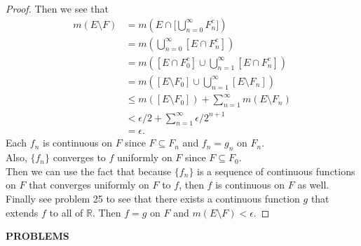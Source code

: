 \begin{flushleft}
\begin{proof}
        Then we see that
        \begin{align*}
            m(E\setminus F)&=m(E\cap\biggr[\bigcup_{n=0}^\infty F_n^c\biggl])\\
            &=m(\bigcup_{n=0}^\infty [E\cap F_n^c])\\
            &=m([E\cap F_0^c]\cup\bigcup_{n=1}^\infty [E\cap F_n^c])\\
            &=m([E\setminus F_0]\cup\bigcup_{n=1}^\infty [E\setminus F_n])\\
            &\le m([E\setminus F_0])+\sum_{n=1}^\infty m( E\setminus F_n)\\
            &<\epsilon/2+\sum_{n=1}^\infty\epsilon/2^{n+1}\\
            &=\epsilon.
        \end{align*}
        Each $f_n$ is continuous on $F$ since $F\subseteq F_n$ and $f_n=g_n$ on $F_n$.
        \\Also, $\{f_n\}$ converges to $f$ uniformly on $F$ since $F\subseteq F_0$. 
        \\Then we can use the fact that because $\{f_n\}$ is a sequence of continuous functions on $F$ that converges uniformly on $F$ to $f$, then $f$ is continuous on $F$ as well.
        \\Finally see problem 25 to see that there exists a continuous function $g$ that extends $f$ to all of $\mathbb{R}$.
        Then $f=g$ on $F$ and $m(E\setminus F)<\epsilon$.
    \end{proof}
\end{flushleft}
\begin{center}
	\textbf{PROBLEMS}
\end{center}
